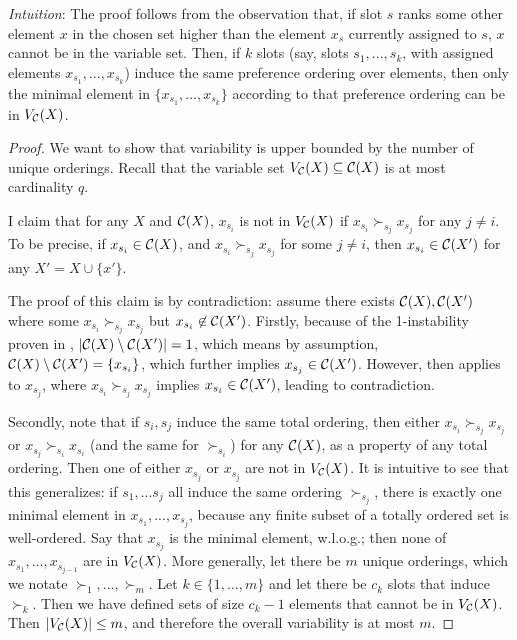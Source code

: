 \textit{Intuition}:
The proof follows from the observation that, if slot $s$ ranks some other element $x$ in the chosen set higher than the element $x_s$ currently assigned to $s$, $x$ cannot be in the variable set. Then, if $k$ slots (say, slots $s_1, ..., s_k$, with assigned elements $x_{s_1}, ..., x_{s_k}$) induce the same preference ordering over elements, then only the minimal element in $\{x_{s_1}, ..., x_{s_k}\}$ according to that preference ordering can be in $V_{\mathcal{C}}(X)$.

\begin{proof}
We want to show that variability is upper bounded by the number of unique orderings. Recall that the variable set $V_{\mathcal{C}}(X) \subseteq \mathcal{C}(X)$ is at most cardinality $q$.

I claim that for any $X$ and $\mathcal{C}(X)$, $x_{s_i}$ is not in $V_{\mathcal{C}}(X)$ if $x_{s_i} \succ_{s_j} x_{s_j}$ for any $j \neq i$.
To be precise, if $x_{s_i} \in \mathcal{C}(X)$, and $x_{s_i} \succ_{s_j} x_{s_j}$ for some $j \neq i$, then $x_{s_i} \in \mathcal{C}(X')$ for any $X' = X \cup \{x'\}$.

The proof of this claim is by contradiction: assume there exists $\mathcal{C}(X), \mathcal{C}(X')$ where some $x_{s_i} \succ_{s_j} x_{s_j}$ but $x_{s_i} \not\in \mathcal{C}(X')$. Firstly, because of the 1-instability proven in , $|\mathcal{C}(X) \setminus \mathcal{C}(X')| = 1$, which means by assumption, $\mathcal{C}(X) \setminus \mathcal{C}(X') = \{x_{s_i}\}$, which further implies $x_{s_j} \in \mathcal{C}(X')$. However,   then applies to $x_{s_j}$, where $x_{s_i} \succ_{s_j} x_{s_j}$ implies $x_{s_i} \in \mathcal{C}(X')$, leading to contradiction.

Secondly, note that if $s_i, s_j$ induce the same total ordering, then either $x_{s_i} \succ_{s_j} x_{s_j}$ or $x_{s_j} \succ_{s_i} x_{s_i}$ (and the same for $\succ_{s_i}$) for any $\mathcal{C}(X)$, as a property of any total ordering. Then one of either $x_{s_j}$ or $x_{s_j}$ are not in $V_{\mathcal{C}}(X)$. It is intuitive to see that this generalizes: if $s_1, ... s_j$ all induce the same ordering $\succ_{s_j}$, there is exactly one minimal element in $x_{s_1}, ..., x_{s_j}$, because any finite subset of a totally ordered set is well-ordered.
Say that $x_{s_j}$ is the minimal element, w.l.o.g.; then none of $x_{s_1}, ..., x_{s_{j-1}}$ are in $V_{\mathcal{C}}(X)$. More generally, let there be $m$ unique orderings, which we notate $\succ_1,..., \succ_m$. Let $k \in \{1,..., m\}$ and let there be $c_k$ slots that induce $\succ_k$. Then we have
defined sets of size $c_k-1$ elements that cannot be in $V_{\mathcal{C}}(X)$. Then $|V_{\mathcal{C}}(X)| \leq m$, and therefore the overall variability is at most $m$.
\end{proof}

